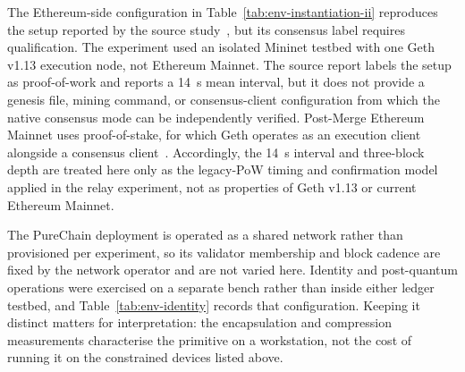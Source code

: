 The Ethereum-side configuration in Table~\ref{tab:env-instantiation-ii}
reproduces the setup reported by the source study~\cite{amadi2026symmetric}, but
its consensus label requires qualification. The experiment used an isolated
Mininet testbed with one Geth v1.13 execution node, not Ethereum Mainnet. The
source report labels the setup as proof-of-work and reports a 14~s mean interval,
but it does not provide a genesis file, mining command, or consensus-client
configuration from which the native consensus mode can be independently
verified. Post-Merge Ethereum Mainnet uses proof-of-stake, for which Geth operates
as an execution client alongside a consensus client~\cite{geth-node-architecture}.
Accordingly, the 14~s interval and three-block depth are treated here only as the
legacy-PoW timing and confirmation model applied in the relay experiment, not as
properties of Geth v1.13 or current Ethereum Mainnet.

The PureChain deployment is operated as a shared network rather than provisioned per experiment, so its validator membership and block cadence are fixed by the network operator and are not varied here. Identity and post-quantum operations were exercised on a separate bench rather than inside either ledger testbed, and Table~\ref{tab:env-identity} records that configuration. Keeping it distinct matters for interpretation: the encapsulation and compression measurements characterise the primitive on a workstation, not the cost of running it on the constrained devices listed above.

